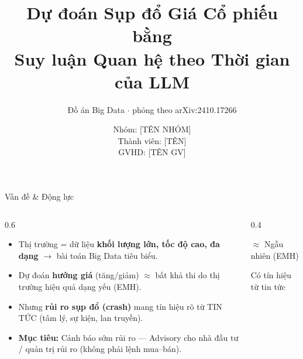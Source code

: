\documentclass[aspectratio=169, 10pt]{beamer}
\title{Dự đoán Sụp đổ Giá Cổ phiếu bằng\\ Suy luận Quan hệ theo Thời gian của LLM}
\subtitle{Đồ án Big Data $\cdot$ phỏng theo arXiv:2410.17266}
\author{Nhóm: [TÊN NHÓM] \\ Thành viên: [TÊN] \\ GVHD: [TÊN GV]}
\institute{Học kỳ / Năm}
\date{}
\begin{document}
\begin{frame}
    \titlepage
\end{frame}

\begin{frame}{Vấn đề \& Động lực}
    \begin{columns}
        \begin{column}{0.6\textwidth}
            \begin{itemize}
                \item Thị trường = dữ liệu \textbf{khối lượng lớn, tốc độ cao, đa dạng} $\rightarrow$ bài toán Big Data tiêu biểu.
                \item Dự đoán \textbf{hướng giá} (tăng/giảm) $\approx$ bất khả thi do thị trường hiệu quả dạng yếu (EMH).
                \item Nhưng \textbf{rủi ro sụp đổ (crash)} mang tín hiệu rõ từ TIN TỨC (tâm lý, sự kiện, lan truyền).
                \item \textbf{Mục tiêu:} Cảnh báo sớm rủi ro — Advisory cho nhà đầu tư / quản trị rủi ro (không phải lệnh mua–bán).
            \end{itemize}
        \end{column}
        \begin{column}{0.4\textwidth}
            \begin{tcolorbox}[colback=white, colframe=myred, title=Hướng giá (lên/xuống), fonttitle=\bfseries\small, boxrule=0.5mm]
                \centering $\approx$ Ngẫu nhiên (EMH)
            \end{tcolorbox}
            \vspace{0.2cm}
            \begin{tcolorbox}[colback=white, colframe=mygreen, title=Rủi ro sụp đổ (tail-risk), fonttitle=\bfseries\small, boxrule=0.5mm]
                \centering \checkmark Có tín hiệu từ tin tức
            \end{tcolorbox}
        \end{column}
    \end{columns}
\end{frame}
\end{document}
